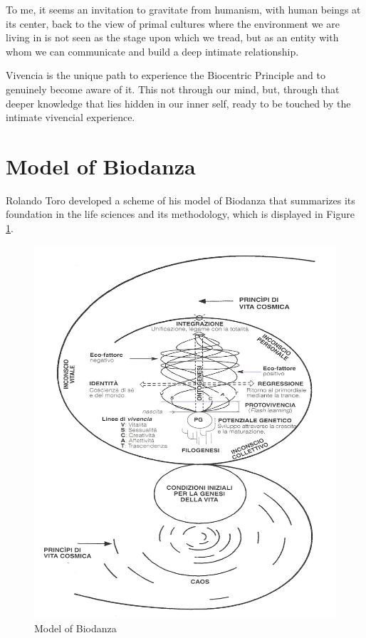 \documentclass[
  11pt,
]{book}
\begin{document}
To me, it seems an invitation to gravitate from humanism, with human beings at its center, back to the view of primal cultures where the environment we are living in is not seen as the stage upon which we tread, but as an entity with whom we can communicate and build a deep intimate relationship.

Vivencia is the unique path to experience the Biocentric Principle and to genuinely become aware of it. This not through our mind, but, through that deeper knowledge that lies hidden in our inner self, ready to be touched by the intimate vivencial experience.

\hypertarget{model-of-biodanza}{%
\section{Model of Biodanza}\label{model-of-biodanza}}

Rolando Toro developed a scheme of his model of Biodanza that summarizes its foundation in the life sciences and its methodology, which is displayed in Figure \ref{fig:model}.

\begin{figure}

{\centering \includegraphics[width=1\linewidth]{./figs/biodanzaModel} 

}

\caption{Model of Biodanza}\label{fig:model}
\end{figure}
\end{document}
